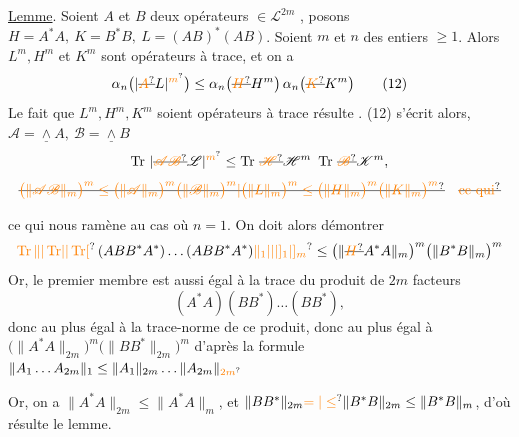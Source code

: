 \uline{Lemme}. Soient $A$ et $B$ deux opérateurs $\in\mathcal L^{2m}$ , posons
$H=A^*A,\ K=B^*B,\ L=(AB)^*(AB)$.
  Soient $m$ et $n$ des entiers $\geq1$.
Alors  $L^m,H^m$ et $K^m$ sont opérateurs à trace, et on a
\[
\alpha_n\bigl(|\deleted{\unsure{A}}L|^{\unsure{m}}\bigr)
\leq\alpha_n\bigl(\deleted{\unsure{H}}H^m\bigr)\,\alpha_n\bigl(\deleted{\unsure{K}}K^m\bigr)
\tag*{(12)}
\]
Le fait que $L^m,H^m,K^m$ soient opérateurs à trace résulte  . (12) s'écrit alors, 
 $\mathscr A=\underline{\wedge} A,\ \mathscr B=\underline{\wedge} B$
\[
\operatorname{Tr}\,|\deleted{\unsure{\mathscr A\mathscr B}}\mathscr L|^{\unsure{m}}\leq
\operatorname{Tr}\,\deleted{\unsure{\mathscr H}}\mathscr H^m\ \operatorname{Tr}\,\deleted{\unsure{\mathscr B}}\mathscr K^m,
\]
\[
\deleted{\unsure{\bigl(\|\mathscr A\mathscr B\|_m\bigr)^m\leq
\bigl(\|\mathscr A\|_m\bigr)^m\bigl(\|\mathscr B\|_m\bigr)^m|\bigl(\|L\|_m\bigr)^m\leq\bigl(\|H\|_m\bigr)^m\bigl(\|K\|_m\bigr)^m}}\quad
\deleted{\text{\unsure{ce qui}}}
\]

ce qui nous ramène au cas où $n=1$. On doit alors démontrer
\[
\unsure{\operatorname{Tr}\||\operatorname{Tr}\lvert|\operatorname{Tr}[}\,(ABB^*A^*)\ldots(ABB^*A^*)\unsure{\|_1|\rvert|]_1|]_m}
\leq\bigl(\|\deleted{\unsure{H}}A^*A\|_m\bigr)^m\bigl(\|B^*B\|_m\bigr)^m
\]
Or, le premier membre  est aussi égal à la
 trace du produit de $2m$ facteurs
\[
(A^*A)(BB^*)\ldots(BB^*),
\]
donc au plus égal à la trace-norme de ce produit, donc au plus égal à
$\bigl(\|A^*A\|_{2m}\bigr)^m\bigl(\|BB^*\|_{2m}\bigr)^m$
d'après la formule $\|A_1\ldots A_{2m}\|_1\leq\|A_1\|_{2m}\ldots\|A_{2m}\|_{\unsure{2m}}$

Or, on a $\|A^*A\|_{2m}\leq\|A^*A\|_m$, et
$\|BB^*\|_{2m}\unsure{=|\leq}\|B^*B\|_{2m}\leq\|B^*B\|_m$, d'où résulte le lemme.
